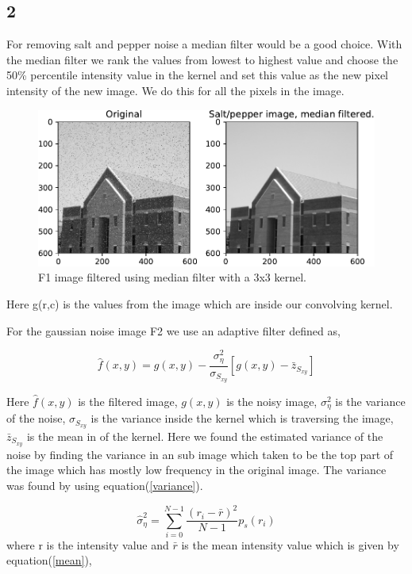 {\subsection{2}

For removing salt and pepper noise a median filter would be a good choice. With the median filter we rank the values from lowest to highest value and choose the 50\% percentile intensity value in the kernel and set this value as the new pixel intensity of the new image. We do this for all the pixels in the image.


\begin{figure}[!htb]
    {\centering
        \includegraphics[width=1\textwidth]{Filtered_saltimage.pdf}
        \caption{F1 image filtered using median filter with a 3x3 kernel.}
        \label{salt}
    \par}
    \end{figure}
Here g(r,c) is the values from the image which are inside our convolving kernel.

For the gaussian noise image F2 we use an adaptive filter defined as,

\begin{equation}
    \hat{f}(x,y) = g(x,y) - \frac{\sigma^{2}_{\eta}}{\sigma_{S_{xy}}}\left[g(x,y) - \bar{z}_{S_{xy}}\right]
    \label{adaptive}
\end{equation}

Here $\hat{f}(x,y)$ is the filtered image, $g(x,y)$ is the noisy image, $\sigma^{2}_{\eta}$ is the variance of the noise, $\sigma_{S_{xy}}$ is the variance inside the kernel which is traversing the image, $\bar{z}_{S_{xy}}$ is the mean in of the kernel. Here we found the estimated variance of the noise by finding the variance in an sub image which taken to be the top part of the image which has mostly low frequency in the original image. The variance was found by using equation(\ref{variance}).

\begin{equation}
    \hat{\sigma}^{2}_{\eta} = \sum_{i = 0}^{N-1}\frac{(r_{i} - \bar{r})^{2}}{N-1}p_{s}(r_{i})
    \label{variance}
\end{equation}
where r is the intensity value and $\bar{r}$ is the mean intensity value which is given by equation(\ref{mean}),

}
